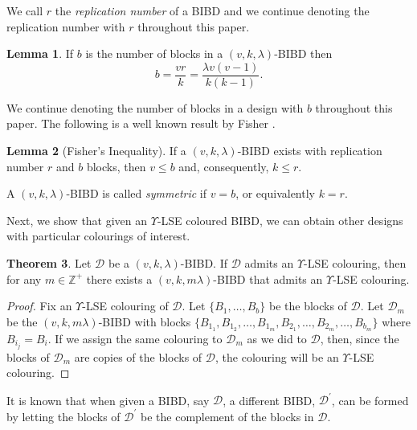 \documentclass[12pt]{article}
\theoremstyle{definition}
\newtheorem{theorem}{Theorem}[section]
\newtheorem{lemma}[theorem]{Lemma}
\newcommand{\deviations}{\Upsilon}
\begin{document}
We call $r$ the \emph{replication number} of a BIBD and we continue denoting the replication number with $r$ throughout this paper. 

\begin{lemma}\label{lem: num of blocks in a BIBD}
    If $b$ is the number of blocks in a $(v,k,\lambda)$-BIBD then $$b = \frac{vr}{k} = \frac{\lambda v(v-1)}{k(k-1)}.$$
\end{lemma}

We continue denoting the number of blocks in a design with $b$ throughout this paper. The following is a well known result by Fisher \cite{F40}.

\begin{lemma}[Fisher's Inequality]\label{lem: Fisher's ineq.}
    If a $(v,k,\lambda)$-BIBD exists with replication number $r$ and $b$ blocks, then $v\leq b$ and, consequently, $k \leq r$.
\end{lemma}

A $(v,k,\lambda)$-BIBD is called \emph{symmetric} if $v = b$, or equivalently $k=r$.

Next, we show that given an $\deviations$-LSE coloured BIBD, we can obtain other designs with particular colourings of interest. 

\begin{theorem}\label{thm: duplicating blocks}
    Let $\mathcal{D}$ be a $(v,k,\lambda)$-BIBD. If $\mathcal{D}$ admits an $\deviations$-LSE colouring, then for any $m\in \mathbb{Z}^+$ there exists a $(v,k,m\lambda)$-BIBD that admits an $\deviations$-LSE colouring. 
\end{theorem}

\begin{proof}
    Fix an $\deviations$-LSE colouring of $\mathcal{D}$. Let $\{B_1, \dots, B_b\}$ be the blocks of $\mathcal{D}$. Let $\mathcal{D}_m$ be the $(v,k,m\lambda)$-BIBD with blocks $\{B_{1_1}, B_{1_2}, \dots, B_{1_m}, B_{2_1}, \dots, B_{2_m}, \dots, B_{b_m}\}$ where $B_{i_j} = B_i$. If we assign the same colouring to $\mathcal{D}_m$ as we did to $\mathcal{D}$, then, since the blocks of $\mathcal{D}_m$ are copies of the blocks of $\mathcal{D}$, the colouring will be an $\deviations$-LSE colouring. 
\end{proof}

It is known that when given a BIBD, say $\mathcal{D}$, a different BIBD, $\mathcal{D}^\prime$, can be formed by letting the blocks of $\mathcal{D}^\prime$ be the complement of the blocks in $\mathcal{D}$. 
\end{document}
